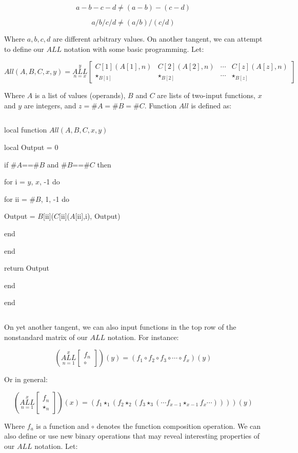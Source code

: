 \documentclass{article}
\begin{document}
$$a-b-c-d \neq (a-b) - (c-d)$$

$$a/b/c/d \neq (a/b)/(c/d)$$

Where $a,b,c,d$ are different arbitrary values. On another tangent, we can attempt to define our $ALL$ notation with some basic programming. Let:

$$All(A, B, C, x, y)=\underset{n=x}{\overset{y}{ALL}} \begin{bmatrix}
C[1](A[1],n) & C[2](A[2],n) & \cdots & C[z](A[z],n) \\
\star_{B[1]}& \star_{B[2]} & \cdots & \star_{B[z]}
\end{bmatrix}$$

Where $A$ is a list of values (operands), $B$ and $C$ are lists of two-input functions, $x$ and $y$ are integers, and $z = \# A = \# B = \# C$. Function $All$ is defined as:

$${}$$

local function $All(A, B, C, x, y)$

local Output = 0

if $\#A$==$\#B$ and $\#B$==$\#C$ then

for i = $y$, $x$, -1 do

for ii = $\#B$, 1, -1 do

Output = $B$[ii]($C$[ii]($A$[ii],i), Output)

end

end

return Output

end

end

$${}$$

On yet another tangent, we can also input functions in the top row of the nonstandard matrix of our $ALL$ notation. For instance:

$$(\underset{n=1}{\overset{x}{ALL}} \begin{bmatrix}
f_n \\
\circ
\end{bmatrix}) (y) = (f_1 \circ f_2 \circ f_3 \circ \cdots \circ f_x)(y)$$

Or in general:

$$(\underset{n=1}{\overset{x}{ALL}} \begin{bmatrix}
f_n \\
\star_n
\end{bmatrix}) (x) = (f_1 \star_1 (f_2 \star_2 (f_3 \star_3 (\cdots f_{x-1} \star_{x-1} f_x \cdots))))(y)$$

Where $f_a$ is a function and $\circ$ denotes the function composition operation. We can also define or use new binary operations that may reveal interesting properties of our $ALL$ notation. Let:
\end{document}
